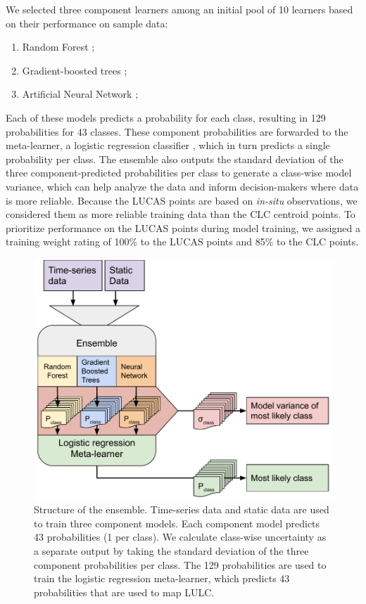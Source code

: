     We selected three component learners among an initial pool of 10 learners based on their performance on sample data:

    \begin{enumerate}
    \item Random Forest \citep{breiman2001random};
    \item Gradient-boosted trees \citep{chen2016xgboost};
    \item Artificial Neural Network \citep{mcculloch1943logical};
    \end{enumerate}

    Each of these models predicts a probability for each class, resulting in 129 probabilities for 43 classes. These component probabilities are forwarded to the meta-learner, a logistic regression classifier \citep{defazio2014saga}, which in turn predicts a single probability per class. The ensemble also outputs the standard deviation of the three component-predicted probabilities per class to generate a class-wise model variance, which can help analyze the data and inform decision-makers where data is more reliable. Because the LUCAS points are based on \emph{in-situ} observations, we considered them as more reliable training data than the CLC centroid points. To prioritize performance on the LUCAS points during model training, we assigned a training weight rating of 100\% to the LUCAS points and 85\% to the CLC points.
    
    \begin{figure}[!hbt]
    \centering
    \includegraphics{figs_03/methods_ensemble_structure.pdf}
    \caption{Structure of the ensemble. Time-series data and static data are used to train three component models. Each component model predicts 43 probabilities (1 per class). We calculate class-wise uncertainty as a separate output by taking the standard deviation of the three component probabilities per class. The 129 probabilities are used to train the logistic regression meta-learner, which predicts 43 probabilities that are used to map LULC.}
    \label{fig:ensemble_structure}
    \end{figure}
        
